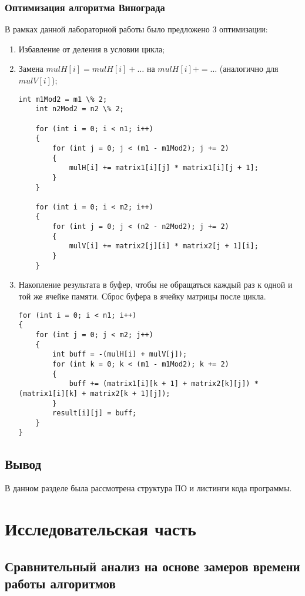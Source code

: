 \documentclass[12pt]{report}
\begin{document}
\subsection{Оптимизация алгоритма Винограда}
В рамках данной лабораторной работы было предложено 3 оптимизации:
\begin{enumerate}
	\item Избавление от деления в условии цикла;
	\item Замена $mulH[i] = mulH[i] + …$ на $mulH[i] += …$ (аналогично для $mulV[i]$);
	
\newpage
	\begin{lstlisting}[label=some-code,caption=Оптимизации алгоритма Винограда №1 и №2]
	int m1Mod2 = m1 \% 2;
	int n2Mod2 = n2 \% 2;

	for (int i = 0; i < n1; i++)
	{
		for (int j = 0; j < (m1 - m1Mod2); j += 2)
		{
			mulH[i] += matrix1[i][j] * matrix1[i][j + 1];
		}
	}

	for (int i = 0; i < m2; i++)
	{
		for (int j = 0; j < (n2 - n2Mod2); j += 2)
		{
			mulV[i] += matrix2[j][i] * matrix2[j + 1][i];
		}
	}
	\end{lstlisting}

	\item Накопление результата в буфер, чтобы не обращаться каждый раз к одной и той же ячейке памяти. Сброс буфера в ячейку матрицы после цикла.
	\begin{lstlisting}[label=some-code,caption=Оптимизации алгоритма Винограда №3]
for (int i = 0; i < n1; i++)
{
	for (int j = 0; j < m2; j++)
	{
		int buff = -(mulH[i] + mulV[j]);
		for (int k = 0; k < (m1 - m1Mod2); k += 2)
		{
			buff += (matrix1[i][k + 1] + matrix2[k][j]) * (matrix1[i][k] + matrix2[k + 1][j]);
		}
		result[i][j] = buff;
	}
}
\end{lstlisting}
\end{enumerate}

\section{Вывод}
В данном разделе была рассмотрена структура ПО и листинги кода программы.


\chapter{Исследовательская часть}

\section{Сравнительный анализ на основе замеров времени работы алгоритмов}
\end{document}
